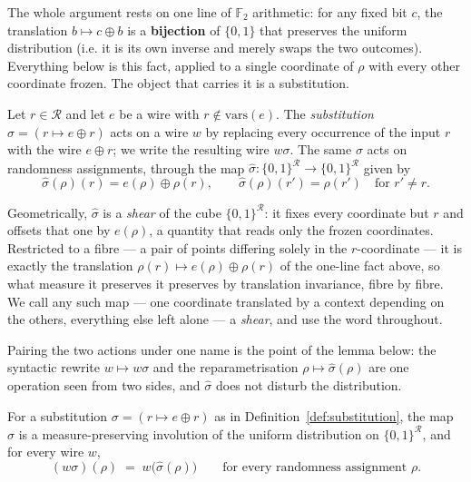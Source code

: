 The whole argument rests on one line of $\mathbb{F}_2$ arithmetic: for any fixed
bit $c$, the translation $b \mapsto c \oplus b$ is a \textbf{bijection} of $\{0,1\}$
that preserves the uniform distribution (i.e. it is its own inverse and merely swaps
the two outcomes). Everything below is this fact, applied to a single coordinate
of $\rho$ with every other coordinate frozen. The object that carries it is a
substitution.

\begin{definition}
\label{def:substitution}
Let $r \in \mathcal{R}$ and let $e$ be a wire with $r \notin \mathrm{vars}(e)$.
The \emph{substitution} $\sigma = (r \mapsto e \oplus r)$ acts on a wire $w$ by
replacing every occurrence of the input $r$ with the wire $e \oplus r$; we write
the resulting wire $w\sigma$. The same $\sigma$ acts on randomness assignments,
through the map $\widehat{\sigma} : \{0,1\}^{\mathcal{R}} \to
\{0,1\}^{\mathcal{R}}$ given by
\[
  \widehat{\sigma}(\rho)(r) = e(\rho) \oplus \rho(r), \qquad
  \widehat{\sigma}(\rho)(r') = \rho(r') \quad \text{for } r' \neq r .
\]
\end{definition}

Geometrically, $\widehat{\sigma}$ is a \emph{shear} of the cube
$\{0,1\}^{\mathcal{R}}$: it fixes every coordinate but $r$ and offsets that one
by $e(\rho)$, a quantity that reads only the frozen coordinates. Restricted to a
fibre --- a pair of points differing solely in the $r$-coordinate --- it is
exactly the translation $\rho(r) \mapsto e(\rho) \oplus \rho(r)$ of the one-line
fact above, so what measure it preserves it preserves by translation invariance,
fibre by fibre. We call any such map --- one coordinate translated by a context
depending on the others, everything else left alone --- a \emph{shear}, and use
the word throughout.

Pairing the two actions under one name is the point of the lemma below: the
syntactic rewrite $w \mapsto w\sigma$ and the reparametrisation
$\rho \mapsto \widehat{\sigma}(\rho)$ are one operation seen from two sides, and
$\widehat{\sigma}$ does not disturb the distribution.

\begin{lemma}[Substitution]
\label{lem:substitution}
For a substitution $\sigma = (r \mapsto e \oplus r)$ as in
Definition~\ref{def:substitution}, the map $\widehat{\sigma}$ is a
measure-preserving involution of the uniform distribution on
$\{0,1\}^{\mathcal{R}}$, and for every wire $w$,
\[
  (w\sigma)(\rho) \;=\; w\big(\widehat{\sigma}(\rho)\big)
  \qquad \text{for every randomness assignment } \rho .
\]
\end{lemma}

